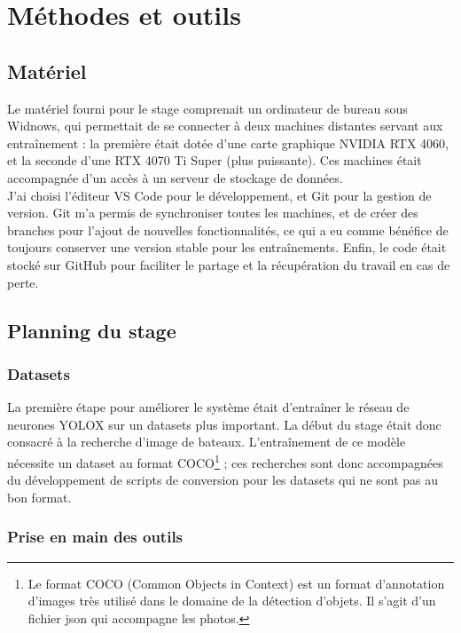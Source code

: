 
\chapter{Méthodes et outils}

\section{Matériel}

Le matériel fourni pour le stage comprenait un ordinateur de bureau sous Widnows, 
qui permettait de se connecter à deux machines distantes servant aux entraînement : 
la première était dotée d'une carte graphique NVIDIA RTX 4060, et la seconde d'une 
RTX 4070 Ti Super (plus puissante). Ces machines était accompagnée d'un accès à un serveur
de stockage de données. \\

J'ai choisi l'éditeur VS Code pour le développement, et Git pour la gestion de version.
Git m'a permis de synchroniser toutes les machines, et de créer des branches pour 
l'ajout de nouvelles fonctionnalités, ce qui a eu comme bénéfice de toujours
conserver une version stable pour les entraînements. Enfin, le code était stocké
sur GitHub pour faciliter le partage et la récupération du travail en cas de perte. \\

\section{Planning du stage}

\subsection{Datasets}

La première étape pour améliorer le système était d'entraîner le réseau de neurones YOLOX
sur un datasets plus important. La début du stage était donc consacré à la recherche 
d'image de bateaux. L'entraînement de ce modèle nécessite un dataset au 
format COCO\footnote{Le format COCO (Common Objects in Context) est un format d'annotation
d'images très utilisé dans le domaine de la détection d'objets. Il s'agit d'un fichier 
json qui accompagne les photos.} ; ces recherches sont donc accompagnées du développement
de scripts de conversion pour les datasets qui ne sont pas au bon format.\\

\subsection{Prise en main des outils}

